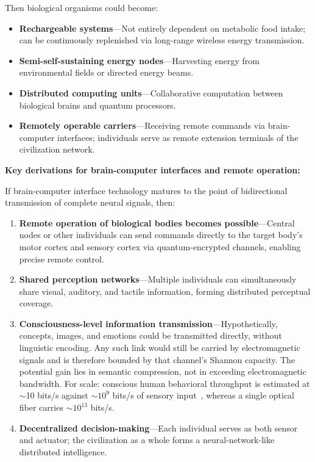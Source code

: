 \documentclass[aps,prd,twocolumn,superscriptaddress,nofootinbib]{revtex4-2}
\begin{document}
Then biological organisms could become:

\begin{itemize}
  \item \textbf{Rechargeable systems}---Not entirely dependent on metabolic food intake; can be continuously replenished via long-range wireless energy transmission.
  \item \textbf{Semi-self-sustaining energy nodes}---Harvesting energy from environmental fields or directed energy beams.
  \item \textbf{Distributed computing units}---Collaborative computation between biological brains and quantum processors.
  \item \textbf{Remotely operable carriers}---Receiving remote commands via brain-computer interfaces; individuals serve as remote extension terminals of the civilization network.
\end{itemize}

\textbf{Key derivations for brain-computer interfaces and remote operation:}

If brain-computer interface technology matures to the point of bidirectional transmission of complete neural signals, then:

\begin{enumerate}
  \item \textbf{Remote operation of biological bodies becomes possible}---Central nodes or other individuals can send commands directly to the target body's motor cortex and sensory cortex via quantum-encrypted channels, enabling precise remote control.
  \item \textbf{Shared perception networks}---Multiple individuals can simultaneously share visual, auditory, and tactile information, forming distributed perceptual coverage.
  \item \textbf{Consciousness-level information transmission}---Hypothetically, concepts, images, and emotions could be transmitted directly, without linguistic encoding. Any such link would still be carried by electromagnetic signals and is therefore bounded by that channel's Shannon capacity. The potential gain lies in semantic compression, not in exceeding electromagnetic bandwidth. For scale: conscious human behavioral throughput is estimated at ${\sim}$10 bits/s against ${\sim}10^{9}$ bits/s of sensory input~\cite{Zheng2025}, whereas a single optical fiber carries ${\sim}10^{13}$ bits/s.
  \item \textbf{Decentralized decision-making}---Each individual serves as both sensor and actuator; the civilization as a whole forms a neural-network-like distributed intelligence.
\end{enumerate}
\end{document}
